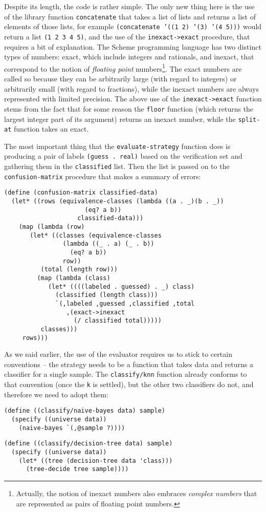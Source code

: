 Despite its length, the code is rather simple. The only new
thing here is the use of the library function \texttt{concatenate}
that takes a list of lists and returns a list of elements of
those lists, for example \texttt{(concatenate '((1 2) '(3) '(4 5)))}
would return a list \texttt{(1 2 3 4 5)}, and the use of the
\texttt{inexact->exact} procedure, that requires a bit of
explanation. The Scheme programming language has two distinct
types of numbers: exact, which include integers and rationals,
and inexact, that correspond to the notion of \textit{floating
point} numbers\footnote{Actually, the notion of inexact numbers
also embraces \textit{complex numbers} that are represented
as pairs of floating point numbers.}. The exact numbers are called
so because they can be arbitrarily large (with regard to integers)
or arbitrarily small (with regard to fractions), while the
inexact numbers are always represented with limited precision.
The above use of the \texttt{inexact->exact} function stems from
the fact that for some reason the \texttt{floor} function
(which returns the largest integer part of its argument)
returns an inexact number, while the \texttt{split-at} function
takes an exact.

The most important thing that the \texttt{evaluate-strategy}
function does is producing a pair of labels \texttt{(guess . real)}
based on the verification set and gathering them in the
\texttt{classified} list. Then the list is passed on to the
\texttt{confusion-matrix} procedure that makes a summary of
errors:

\begin{Verbatim}[samepage=true]
(define (confusion-matrix classified-data)
  (let* ((rows (equivalence-classes (lambda ((a . _)(b . _))
				      (eq? a b))
				    classified-data)))
    (map (lambda (row)
	   (let* ((classes (equivalence-classes
			    (lambda ((_ . a) (_ . b))
			      (eq? a b))
			    row))
		  (total (length row)))
	     (map (lambda (class)
		    (let* ((((labeled . guessed) . _) class)
			  (classified (length class)))
		      `(,labeled ,guessed ,classified ,total 
				 ,(exact->inexact 
				   (/ classified total)))))
		  classes)))
	 rows)))
\end{Verbatim}

As we said earlier, the use of the evaluator requires us
to stick to certain conventions -- the strategy needs to
be a function that takes data and returns a classifier
for a single sample. The \texttt{classify/knn} function
already conforms to that convention (once the \texttt{k}
is settled), but the other two classifiers do not, and
therefore we need to adopt them:
\begin{Verbatim}[samepage=true]
(define ((classify/naive-bayes data) sample)
  (specify ((universe data))
    (naive-bayes `(,@sample ?))))
\end{Verbatim}
\begin{Verbatim}[samepage=true]
(define ((classify/decision-tree data) sample)
  (specify ((universe data))
    (let* ((tree (decision-tree data 'class)))
      (tree-decide tree sample))))
\end{Verbatim}

